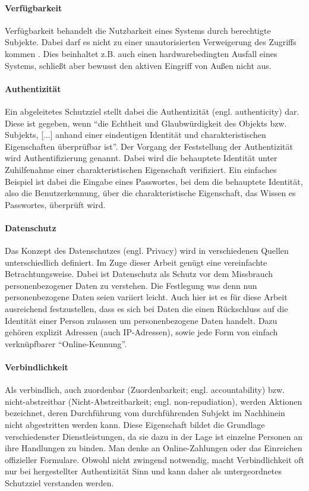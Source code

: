 \paragraph{Verfügbarkeit}
Verfügbarkeit behandelt die Nutzbarkeit eines Systems durch berechtigte Subjekte. Dabei darf es nicht zu einer unautorisierten Verweigerung des Zugriffs kommen \cite[p. 12]{Eckert2013}. Dies beinhaltet z.B. auch einen hardwarebedingten Ausfall eines Systems, schließt aber bewusst den aktiven Eingriff von Außen nicht aus.
 
\paragraph{Authentizität}
Ein abgeleitetes Schutzziel stellt dabei die Authentizität (engl. authenticity) dar. Diese ist gegeben, wenn ``die Echtheit und Glaubwürdigkeit des Objekts bzw. Subjekts, [...] anhand einer eindeutigen Identität und charakteristischen Eigenschaften überprüfbar ist''\cite[p. 8]{Eckert2013}. Der Vorgang der Feststellung der Authentizität wird Authentifizierung genannt. Dabei wird die behauptete Identität unter Zuhilfenahme einer charakteristischen Eigenschaft verifiziert. Ein einfaches Beispiel ist dabei die Eingabe eines Passwortes, bei dem die behauptete Identität, also die Benutzerkennung, über die charakteristische Eigenschaft, das Wissen es Passwortes, überprüft wird.  

\paragraph{Datenschutz}
Das Konzept des Datenschutzes (engl. Privacy) wird in verschiedenen Quellen unterschiedlich definiert. Im Zuge dieser Arbeit genügt eine vereinfachte Betrachtungsweise. Dabei ist Datenschutz als Schutz vor dem Missbrauch personenbezogener Daten zu verstehen. Die Festlegung was denn nun personenbezogene Daten seien variiert leicht. Auch hier ist es für diese Arbeit ausreichend festzustellen, dass es sich bei Daten die einen Rückschluss auf die Identität einer Person zulassen um personenbezogene Daten handelt. Dazu gehören explizit Adressen (auch IP-Adressen), sowie jede Form von einfach verknüpfbarer ``Online-Kennung''\cite{Schwenke2018}.     

\paragraph{Verbindlichkeit}
Als verbindlich, auch zuordenbar (Zuordenbarkeit; engl. accountability) bzw. nicht-abstreitbar (Nicht-Abstreitbarkeit; engl. non-repudiation), werden Aktionen bezeichnet, deren Durchführung vom durchführenden Subjekt im Nachhinein nicht abgestritten werden kann. Diese Eigenschaft bildet die Grundlage verschiedenster Dienstleistungen, da sie dazu in der Lage ist einzelne Personen an ihre Handlungen zu binden. Man denke an Online-Zahlungen oder das Einreichen offizieller Formulare. Obwohl nicht zwingend notwendig, macht Verbindlichkeit oft nur bei hergestellter Authentizität Sinn und kann daher als untergeordnetes Schutzziel verstanden werden.


